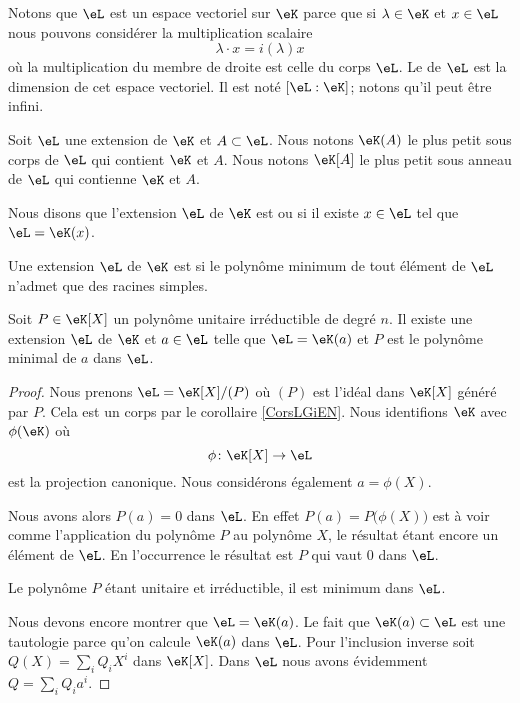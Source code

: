 Notons que \( \eL\) est un espace vectoriel sur \( \eK\) parce que si \( \lambda\in \eK\) et \( x\in \eL\) nous pouvons considérer la multiplication scalaire
\begin{equation}
    \lambda\cdot x=i(\lambda)x
\end{equation}
où la multiplication du membre de droite est celle du corps \( \eL\). Le  de \( \eL\) est la dimension de cet espace vectoriel. Il est noté \( [\eL:\eK]\); notons qu'il peut être infini.

Soit \( \eL\) une extension de \( \eK\) et \( A\subset \eL\). Nous notons \( \eK(A)\) le plus petit sous corps de \( \eL\) qui contient \( \eK\) et \( A\). Nous notons \( \eK[A]\) le plus petit sous anneau de \( \eL\) qui contienne \( \eK\) et \( A\).

Nous disons que l'extension \( \eL\) de \( \eK\) est  ou  si il existe \( x\in\eL\) tel que \( \eL=\eK(x)\).

Une extension \( \eL\) de \( \eK\) est  si le polynôme minimum de tout élément de \( \eL\) n'admet que des racines simples.

\begin{lemma}
    Soit \( P\in\eK[X]\) un polynôme unitaire irréductible de degré \( n\). Il existe une extension \( \eL\) de \( \eK\) et \( a\in \eL\) telle que \( \eL=\eK(a)\) et \( P\) est le polynôme minimal de \( a\) dans \( \eL\).
\end{lemma}

\begin{proof}
    Nous prenons \( \eL=\eK[X]/(P)\) où \( (P)\) est l'idéal dans \( \eK[X]\) généré par \( P\). Cela est un corps par le corollaire \ref{CorsLGiEN}. Nous identifions \( \eK\) avec \( \phi(\eK)\) où
    \begin{equation}
        \phi\colon \eK[X]\to \eL 
    \end{equation}
    est la projection canonique. Nous considérons également \( a=\phi(X)\).

    Nous avons alors \( P(a)=0\) dans \( \eL\). En effet \( P(a)=P\big( \phi(X) \big)\) est à voir comme l'application du polynôme \( P\) au polynôme \( X\), le résultat étant encore un élément de \( \eL\). En l'occurrence le résultat est \( P\) qui vaut \( 0\) dans \( \eL\).

    Le polynôme \( P\) étant unitaire et irréductible, il est minimum dans \( \eL\).

    Nous devons encore montrer que \( \eL=\eK(a)\). Le fait que \( \eK(a)\subset \eL\) est une tautologie parce qu'on calcule \( \eK(a)\) dans \( \eL\). Pour l'inclusion inverse soit \( Q(X)=\sum_iQ_iX^i\) dans \( \eK[X]\). Dans \( \eL\) nous avons évidemment \( Q=\sum_iQ_ia^i\).
\end{proof}

